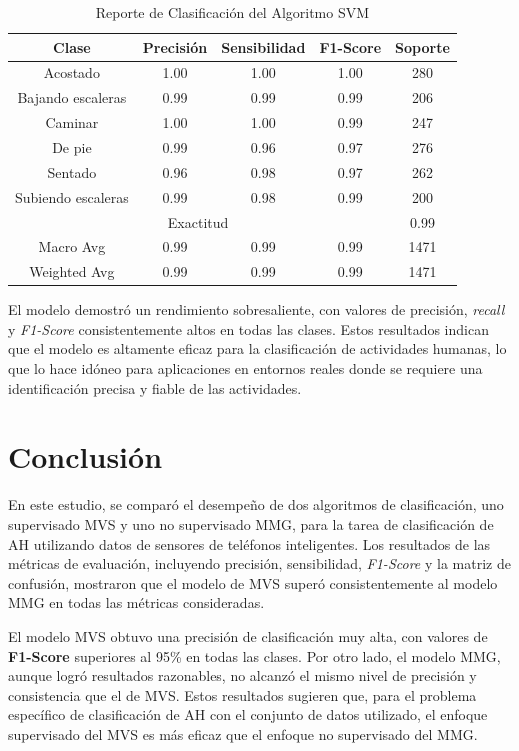 \documentclass{esannV2}
\begin{document}
\begin{table}[h]
    \centering
    \begin{tabular}{|c|c|c|c|c|}
        \hline
        \textbf{Clase} & \textbf{Precisión} & \textbf{Sensibilidad} & \textbf{F1-Score} & \textbf{Soporte} \\ \hline
        Acostado & 1.00 & 1.00 & 1.00 & 280 \\ \hline
        Bajando escaleras & 0.99 & 0.99 & 0.99 & 206 \\ \hline
        Caminar & 1.00 & 1.00 & 0.99 & 247 \\ \hline
        De pie & 0.99 & 0.96 & 0.97 & 276 \\ \hline
        Sentado & 0.96 & 0.98 & 0.97 & 262 \\ \hline
        Subiendo escaleras & 0.99 & 0.98 & 0.99 & 200 \\ \hline
        \multicolumn{4}{|c|}{Exactitud} & 0.99 \\ \hline
        \multicolumn{1}{|c|}{Macro Avg} & 0.99 & 0.99 & 0.99 & 1471 \\ \hline
        \multicolumn{1}{|c|}{Weighted Avg} & 0.99 & 0.99 & 0.99 & 1471 \\ \hline
    \end{tabular}
    \caption{Reporte de Clasificación del Algoritmo SVM}
    \label{tab:classification_report}
\end{table}

El modelo demostró un rendimiento sobresaliente, con valores de precisión, \textit{recall} y \textit{F1-Score} consistentemente altos en todas las clases. Estos resultados indican que el modelo es altamente eficaz para la clasificación de actividades humanas, lo que lo hace idóneo para aplicaciones en entornos reales donde se requiere una identificación precisa y fiable de las actividades.

\section{Conclusión}
En este estudio, se comparó el desempeño de dos algoritmos de clasificación, uno supervisado MVS y uno no supervisado MMG, para la tarea de clasificación de AH utilizando datos de sensores de teléfonos inteligentes. Los resultados de las métricas de evaluación, incluyendo precisión, sensibilidad, \textit{F1-Score} y la matriz de confusión, mostraron que el modelo de MVS superó consistentemente al modelo MMG en todas las métricas consideradas.

El modelo MVS obtuvo una precisión de clasificación muy alta, con valores de \textbf{F1-Score} superiores al 95\% en todas las clases. Por otro lado, el modelo MMG, aunque logró resultados razonables, no alcanzó el mismo nivel de precisión y consistencia que el de MVS. Estos resultados sugieren que, para el problema específico de clasificación de AH con el conjunto de datos utilizado, el enfoque supervisado del MVS es más eficaz que el enfoque no supervisado del MMG.
\end{document}
